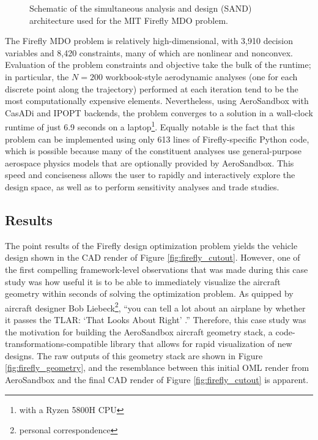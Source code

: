 \begin{figure}[h]
    \centering
    
    \caption{Schematic of the simultaneous analysis and design (SAND) architecture used for the MIT Firefly MDO problem.}
    \label{fig:sand}
\end{figure}

The Firefly MDO problem is relatively high-dimensional, with 3,910 decision variables and 8,420 constraints, many of which are nonlinear and nonconvex. Evaluation of the problem constraints and objective take the bulk of the runtime; in particular, the $N=200$ workbook-style aerodynamic analyses (one for each discrete point along the trajectory) performed at each iteration tend to be the most computationally expensive elements. Nevertheless, using AeroSandbox with CasADi and IPOPT backends, the problem converges to a solution in a wall-clock runtime of just 6.9 seconds on a laptop\footnote{with a Ryzen 5800H CPU}. Equally notable is the fact that this problem can be implemented using only 613 lines of Firefly-specific Python code, which is possible because many of the constituent analyses use general-purpose aerospace physics models that are optionally provided by AeroSandbox. This speed and conciseness allows the user to rapidly and interactively explore the design space, as well as to perform sensitivity analyses and trade studies.

\subsection{Results}

The point results of the Firefly design optimization problem yields the vehicle design shown in the CAD render of Figure \ref{fig:firefly_cutout}. However, one of the first compelling framework-level observations that was made during this case study was how useful it is to be able to immediately visualize the aircraft geometry within seconds of solving the optimization problem. As quipped by aircraft designer Bob Liebeck\footnote{personal correspondence}, ``you can tell a lot about an airplane by whether it passes the TLAR: `That Looks About Right' .'' Therefore, this case study was the motivation for building the AeroSandbox aircraft geometry stack, a code-transformations-compatible library that allows for rapid visualization of new designs. The raw outputs of this geometry stack are shown in Figure \ref{fig:firefly_geometry}, and the resemblance between this initial OML render from AeroSandbox and the final CAD render of Figure \ref{fig:firefly_cutout} is apparent.

